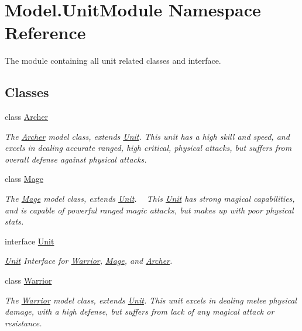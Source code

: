\hypertarget{namespace_model_1_1_unit_module}{}\section{Model.\+Unit\+Module Namespace Reference}
\label{namespace_model_1_1_unit_module}


The module containing all unit related classes and interface.  


\subsection*{Classes}
\begin{DoxyCompactItemize}
\item 
class \hyperlink{class_model_1_1_unit_module_1_1_archer}{Archer}
\begin{DoxyCompactList}\small\item\em The \hyperlink{class_model_1_1_unit_module_1_1_archer}{Archer} model class, extends \hyperlink{interface_model_1_1_unit_module_1_1_unit}{Unit}. This unit has a high skill and speed, and excels in dealing accurate ranged, high critical, physical attacks, but suffers from overall defense against physical attacks. \end{DoxyCompactList}\item 
class \hyperlink{class_model_1_1_unit_module_1_1_mage}{Mage}
\begin{DoxyCompactList}\small\item\em The \hyperlink{class_model_1_1_unit_module_1_1_mage}{Mage} model class, extends \hyperlink{interface_model_1_1_unit_module_1_1_unit}{Unit}. ~\newline
 This \hyperlink{interface_model_1_1_unit_module_1_1_unit}{Unit} has strong magical capabilities, and is capable of powerful ranged magic attacks, but makes up with poor physical stats. \end{DoxyCompactList}\item 
interface \hyperlink{interface_model_1_1_unit_module_1_1_unit}{Unit}
\begin{DoxyCompactList}\small\item\em \hyperlink{interface_model_1_1_unit_module_1_1_unit}{Unit} Interface for \hyperlink{class_model_1_1_unit_module_1_1_warrior}{Warrior}, \hyperlink{class_model_1_1_unit_module_1_1_mage}{Mage}, and \hyperlink{class_model_1_1_unit_module_1_1_archer}{Archer}. \end{DoxyCompactList}\item 
class \hyperlink{class_model_1_1_unit_module_1_1_warrior}{Warrior}
\begin{DoxyCompactList}\small\item\em The \hyperlink{class_model_1_1_unit_module_1_1_warrior}{Warrior} model class, extends \hyperlink{interface_model_1_1_unit_module_1_1_unit}{Unit}. This unit excels in dealing melee physical damage, with a high defense, but suffers from lack of any magical attack or resistance. \end{DoxyCompactList}\end{DoxyCompactItemize}
